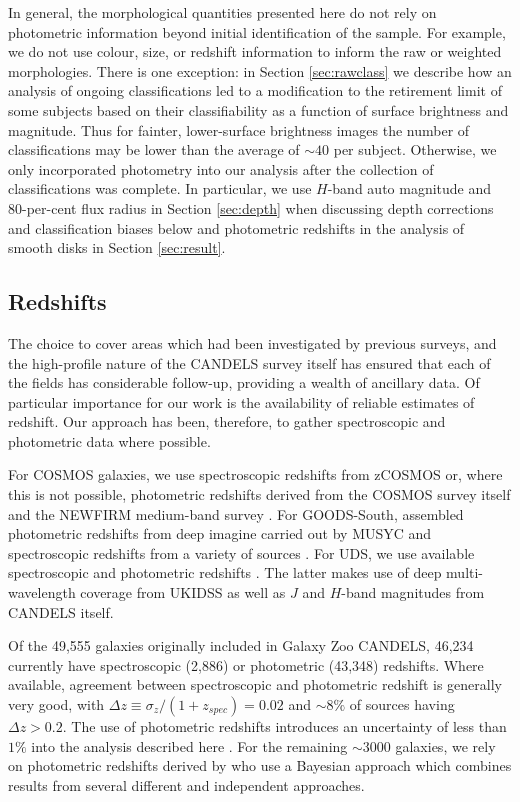 \documentclass[useAMS,usenatbib]{mn2e}
\begin{document}
{In general, the morphological quantities presented here do not rely on photometric information beyond initial identification of the sample. For example, we do not use colour, size, or redshift information to inform the raw or weighted morphologies. There is one exception: in Section \ref{sec:rawclass} we describe how an analysis of ongoing classifications led to a modification to the retirement limit of some subjects based on their classifiability as a function of surface brightness and magnitude. Thus for fainter, lower-surface brightness images the number of classifications may be lower than the average of $\sim40$ per subject. Otherwise, we only incorporated photometry into our analysis after the collection of classifications was complete. In particular, we use $H$-band {\sc auto} magnitude and 80-per-cent flux radius in Section \ref{sec:depth} when discussing depth corrections and classification biases below and photometric redshifts in the analysis of smooth disks in Section \ref{sec:result}. 



\subsection{Redshifts}\label{sec:z}


The choice to cover areas which had been investigated by previous surveys, and the high-profile nature of the CANDELS survey itself has ensured that each of the fields has considerable follow-up, providing a wealth of ancillary data. Of particular importance for our work is the availability of reliable estimates of redshift. Our approach has been, therefore, to gather spectroscopic and photometric data where possible. 

For COSMOS galaxies, we use spectroscopic redshifts from zCOSMOS \citep{lilly07} or, where this is not possible, photometric redshifts derived from the COSMOS survey itself \citep{ilbert09} and the NEWFIRM medium-band survey \citep{whitaker11}. For GOODS-South, \citet{cardamone10b} assembled photometric redshifts from deep imagine carried out by MUSYC \citep{gawiser06} and spectroscopic redshifts from a variety of sources  \citep{balestra10,vanzella08,lefevre04,cimatti02}. For UDS, we use available spectroscopic \citep{simpson12} and photometric redshifts \citep{hartley13}. The latter makes use of deep multi-wavelength coverage from UKIDSS as well as $J$ and $H$-band magnitudes from CANDELS itself. 


Of the 49,555 galaxies originally included in Galaxy Zoo CANDELS, 46,234 currently have spectroscopic (2,886) or photometric (43,348) redshifts. Where available, agreement between spectroscopic and photometric redshift is generally very good, with $\Delta z \equiv \sigma_z/(1+z_{spec}) = 0.02$ and $\sim 8\%$ of sources having $\Delta z > 0.2$. The use of photometric redshifts introduces an uncertainty of less than $1\%$ into the analysis described here \citep{simmons14}. For the remaining $\sim 3000$ galaxies, we rely on photometric redshifts derived by \citet{dahlen13} who use a Bayesian approach which combines results from several different and independent approaches. 





}
\end{document}
